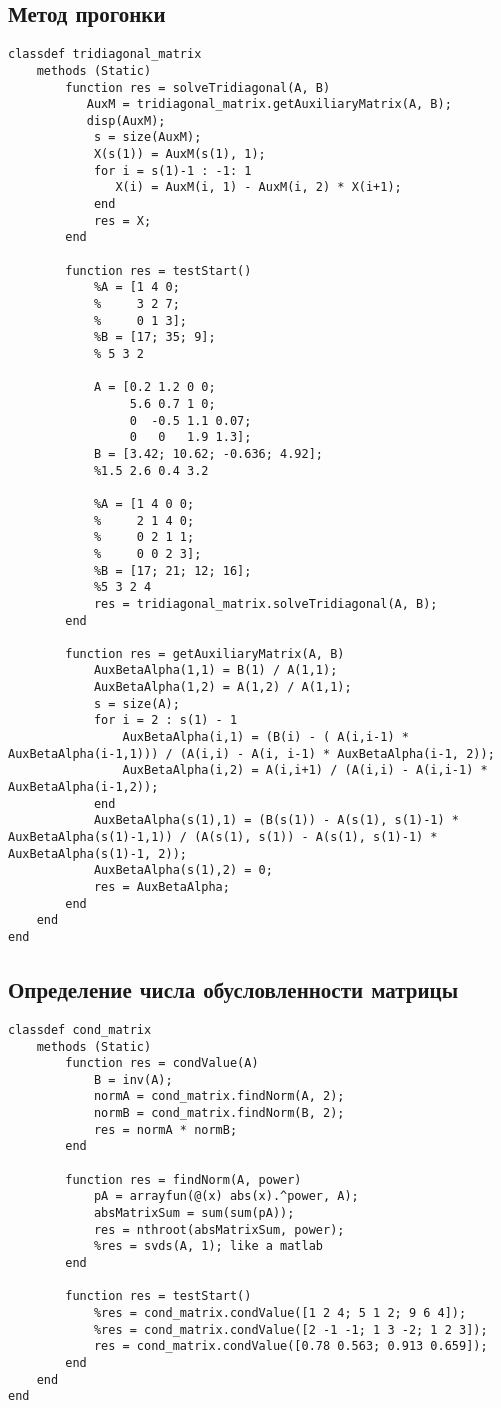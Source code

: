 \documentclass{article}
\begin{document}
\subsection{Метод прогонки}
\begin{lstlisting}
classdef tridiagonal_matrix 
    methods (Static)
        function res = solveTridiagonal(A, B)
           AuxM = tridiagonal_matrix.getAuxiliaryMatrix(A, B);
           disp(AuxM);
            s = size(AuxM);
            X(s(1)) = AuxM(s(1), 1);
            for i = s(1)-1 : -1: 1
               X(i) = AuxM(i, 1) - AuxM(i, 2) * X(i+1);
            end
            res = X;
        end
        
        function res = testStart()
            %A = [1 4 0; 
            %     3 2 7; 
            %     0 1 3];
            %B = [17; 35; 9];
            % 5 3 2
            
            A = [0.2 1.2 0 0;   
                 5.6 0.7 1 0;  
                 0  -0.5 1.1 0.07;  
                 0   0   1.9 1.3];
            B = [3.42; 10.62; -0.636; 4.92];
            %1.5 2.6 0.4 3.2
            
            %A = [1 4 0 0;    
            %     2 1 4 0;  
            %     0 2 1 1;  
            %     0 0 2 3];
            %B = [17; 21; 12; 16];
            %5 3 2 4
            res = tridiagonal_matrix.solveTridiagonal(A, B);
        end

        function res = getAuxiliaryMatrix(A, B)
            AuxBetaAlpha(1,1) = B(1) / A(1,1);
            AuxBetaAlpha(1,2) = A(1,2) / A(1,1);
            s = size(A);
            for i = 2 : s(1) - 1 
                AuxBetaAlpha(i,1) = (B(i) - ( A(i,i-1) * AuxBetaAlpha(i-1,1))) / (A(i,i) - A(i, i-1) * AuxBetaAlpha(i-1, 2));
                AuxBetaAlpha(i,2) = A(i,i+1) / (A(i,i) - A(i,i-1) * AuxBetaAlpha(i-1,2)); 
            end
            AuxBetaAlpha(s(1),1) = (B(s(1)) - A(s(1), s(1)-1) * AuxBetaAlpha(s(1)-1,1)) / (A(s(1), s(1)) - A(s(1), s(1)-1) * AuxBetaAlpha(s(1)-1, 2));
            AuxBetaAlpha(s(1),2) = 0;
            res = AuxBetaAlpha;
        end
    end
end
\end{lstlisting}
\subsection{Определение числа обусловленности матрицы}
\begin{lstlisting}
classdef cond_matrix 
    methods (Static)
        function res = condValue(A)
            B = inv(A);
            normA = cond_matrix.findNorm(A, 2);
            normB = cond_matrix.findNorm(B, 2);
            res = normA * normB;
        end

        function res = findNorm(A, power)
            pA = arrayfun(@(x) abs(x).^power, A);
            absMatrixSum = sum(sum(pA));
            res = nthroot(absMatrixSum, power);
            %res = svds(A, 1); like a matlab
        end
        
        function res = testStart()
            %res = cond_matrix.condValue([1 2 4; 5 1 2; 9 6 4]);
            %res = cond_matrix.condValue([2 -1 -1; 1 3 -2; 1 2 3]);
            res = cond_matrix.condValue([0.78 0.563; 0.913 0.659]);
        end
    end
end
\end{lstlisting}
\end{document}
